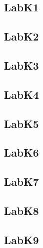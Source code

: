 \documentclass{article}
\begin{document}
\subsection{LabK1}


\pagebreak

\subsection{LabK2}


\pagebreak

\subsection{LabK3}


\subsection{LabK4}


\subsection{LabK5}


\pagebreak

\subsection{LabK6}


\pagebreak

\subsection{LabK7}


\pagebreak

\subsection{LabK8}


\subsection{LabK9}


\end{document}
